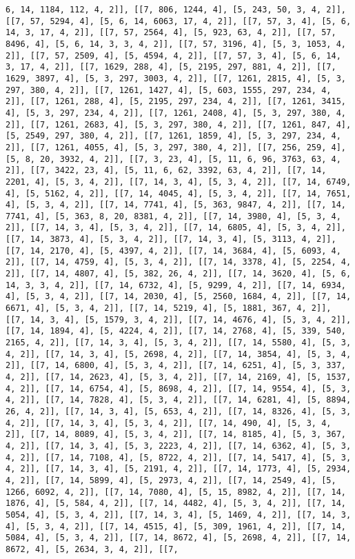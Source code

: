 \documentclass[12pt,fleqn]{article}\usepackage{../../common}
\begin{document}
\begin{verbatim}
6, 14, 1184, 112, 4, 2]], [[7, 806, 1244, 4], [5, 243, 50, 3, 4, 2]], [[7, 57, 5294, 4], [5, 6, 14, 6063, 17, 4, 2]], [[7, 57, 3, 4], [5, 6, 14, 3, 17, 4, 2]], [[7, 57, 2564, 4], [5, 923, 63, 4, 2]], [[7, 57, 8496, 4], [5, 6, 14, 3, 3, 4, 2]], [[7, 57, 3196, 4], [5, 3, 1053, 4, 2]], [[7, 57, 2509, 4], [5, 4594, 4, 2]], [[7, 57, 3, 4], [5, 6, 14, 3, 17, 4, 2]], [[7, 1629, 288, 4], [5, 2195, 297, 881, 4, 2]], [[7, 1629, 3897, 4], [5, 3, 297, 3003, 4, 2]], [[7, 1261, 2815, 4], [5, 3, 297, 380, 4, 2]], [[7, 1261, 1427, 4], [5, 603, 1555, 297, 234, 4, 2]], [[7, 1261, 288, 4], [5, 2195, 297, 234, 4, 2]], [[7, 1261, 3415, 4], [5, 3, 297, 234, 4, 2]], [[7, 1261, 2408, 4], [5, 3, 297, 380, 4, 2]], [[7, 1261, 2683, 4], [5, 3, 297, 380, 4, 2]], [[7, 1261, 847, 4], [5, 2549, 297, 380, 4, 2]], [[7, 1261, 1859, 4], [5, 3, 297, 234, 4, 2]], [[7, 1261, 4055, 4], [5, 3, 297, 380, 4, 2]], [[7, 256, 259, 4], [5, 8, 20, 3932, 4, 2]], [[7, 3, 23, 4], [5, 11, 6, 96, 3763, 63, 4, 2]], [[7, 3422, 23, 4], [5, 11, 6, 62, 3392, 63, 4, 2]], [[7, 14, 2201, 4], [5, 3, 4, 2]], [[7, 14, 3, 4], [5, 3, 4, 2]], [[7, 14, 6749, 4], [5, 5162, 4, 2]], [[7, 14, 4045, 4], [5, 3, 4, 2]], [[7, 14, 7651, 4], [5, 3, 4, 2]], [[7, 14, 7741, 4], [5, 363, 9847, 4, 2]], [[7, 14, 7741, 4], [5, 363, 8, 20, 8381, 4, 2]], [[7, 14, 3980, 4], [5, 3, 4, 2]], [[7, 14, 3, 4], [5, 3, 4, 2]], [[7, 14, 6805, 4], [5, 3, 4, 2]], [[7, 14, 3873, 4], [5, 3, 4, 2]], [[7, 14, 3, 4], [5, 3113, 4, 2]], [[7, 14, 2170, 4], [5, 4397, 4, 2]], [[7, 14, 3684, 4], [5, 6093, 4, 2]], [[7, 14, 4759, 4], [5, 3, 4, 2]], [[7, 14, 3378, 4], [5, 2254, 4, 2]], [[7, 14, 4807, 4], [5, 382, 26, 4, 2]], [[7, 14, 3620, 4], [5, 6, 14, 3, 3, 4, 2]], [[7, 14, 6732, 4], [5, 9299, 4, 2]], [[7, 14, 6934, 4], [5, 3, 4, 2]], [[7, 14, 2030, 4], [5, 2560, 1684, 4, 2]], [[7, 14, 6671, 4], [5, 3, 4, 2]], [[7, 14, 5219, 4], [5, 1881, 367, 4, 2]], [[7, 14, 3, 4], [5, 1579, 3, 4, 2]], [[7, 14, 4676, 4], [5, 3, 4, 2]], [[7, 14, 1894, 4], [5, 4224, 4, 2]], [[7, 14, 2768, 4], [5, 339, 540, 2165, 4, 2]], [[7, 14, 3, 4], [5, 3, 4, 2]], [[7, 14, 5580, 4], [5, 3, 4, 2]], [[7, 14, 3, 4], [5, 2698, 4, 2]], [[7, 14, 3854, 4], [5, 3, 4, 2]], [[7, 14, 6800, 4], [5, 3, 4, 2]], [[7, 14, 6251, 4], [5, 3, 337, 4, 2]], [[7, 14, 2623, 4], [5, 3, 4, 2]], [[7, 14, 2169, 4], [5, 1537, 4, 2]], [[7, 14, 6754, 4], [5, 8698, 4, 2]], [[7, 14, 9554, 4], [5, 3, 4, 2]], [[7, 14, 7828, 4], [5, 3, 4, 2]], [[7, 14, 6281, 4], [5, 8894, 26, 4, 2]], [[7, 14, 3, 4], [5, 653, 4, 2]], [[7, 14, 8326, 4], [5, 3, 4, 2]], [[7, 14, 3, 4], [5, 3, 4, 2]], [[7, 14, 490, 4], [5, 3, 4, 2]], [[7, 14, 8089, 4], [5, 3, 4, 2]], [[7, 14, 8185, 4], [5, 3, 367, 4, 2]], [[7, 14, 3, 4], [5, 3, 2223, 4, 2]], [[7, 14, 6362, 4], [5, 3, 4, 2]], [[7, 14, 7108, 4], [5, 8722, 4, 2]], [[7, 14, 5417, 4], [5, 3, 4, 2]], [[7, 14, 3, 4], [5, 2191, 4, 2]], [[7, 14, 1773, 4], [5, 2934, 4, 2]], [[7, 14, 5899, 4], [5, 2973, 4, 2]], [[7, 14, 2549, 4], [5, 1266, 6092, 4, 2]], [[7, 14, 7080, 4], [5, 15, 8982, 4, 2]], [[7, 14, 1876, 4], [5, 584, 4, 2]], [[7, 14, 4482, 4], [5, 3, 4, 2]], [[7, 14, 5054, 4], [5, 3, 4, 2]], [[7, 14, 3, 4], [5, 1469, 4, 2]], [[7, 14, 3, 4], [5, 3, 4, 2]], [[7, 14, 4515, 4], [5, 309, 1961, 4, 2]], [[7, 14, 5084, 4], [5, 3, 4, 2]], [[7, 14, 8672, 4], [5, 2698, 4, 2]], [[7, 14, 8672, 4], [5, 2634, 3, 4, 2]], [[7, 
\end{verbatim}
\end{document}
